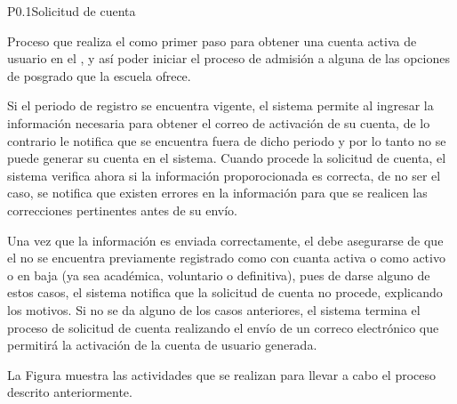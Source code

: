 
\begin{Proceso}{P0.1}{Solicitud de cuenta} {
  

  Proceso que realiza el  como primer paso para obtener una cuenta activa de usuario en el , y así poder iniciar el proceso de admisión a alguna de las opciones de posgrado que la escuela ofrece.
  
  Si el periodo de registro se encuentra vigente, el sistema permite al  ingresar la información necesaria para obtener el correo de activación de su cuenta, de lo contrario le notifica que se encuentra fuera de dicho periodo y por lo tanto no se puede generar su cuenta en el sistema. Cuando procede la solicitud de cuenta, el sistema verifica ahora si la información proporocionada es correcta, de no ser el caso, se notifica que existen errores en la información para que se realicen las correcciones pertinentes antes de su envío.

  Una vez que la información es enviada correctamente, el  debe asegurarse de que el  no se encuentra previamente registrado como  con cuanta activa o como  activo o en baja (ya sea académica, voluntario o definitiva), pues de darse alguno de estos casos, el sistema notifica que la solicitud de cuenta no procede, explicando los motivos. Si no se da alguno de los casos anteriores, el sistema termina el proceso de solicitud de cuenta realizando el envío de un correco electrónico que permitirá la activación de la cuenta de usuario generada.


  \noindent La Figura  muestra las actividades que se realizan para llevar a cabo el proceso descrito anteriormente.


}
\end{Proceso}
